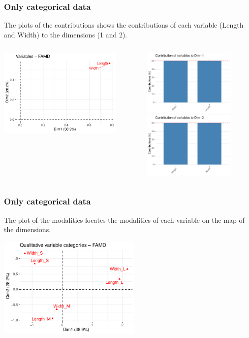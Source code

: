 \begin{frame}
\frametitle{Only categorical data}
\small
The plots of the contributions shows the contributions of each variable (Length and Width) to the dimensions (1 and 2).
\normalsize
\begin{columns}
\begin{column}{0.55\textwidth}
\includegraphics[width=6cm]{../../Graphs/FAMD_contrib_xy.pdf}
\end{column}
\begin{column}{0.45\textwidth}
\includegraphics[width=4.5cm]{../../Graphs/FAMD_contrib_x.pdf}\\
\includegraphics[width=4.5cm]{../../Graphs/FAMD_contrib_y.pdf}
\end{column}
\end{columns}
\end{frame}
\begin{frame}
\frametitle{Only categorical data}
The plot of the modalities locates the modalities of each variable on the map of the dimensions.
\begin{center}
\includegraphics[width=7cm]{../../Graphs/FAMD_quali.pdf}
\end{center}
\end{frame}
